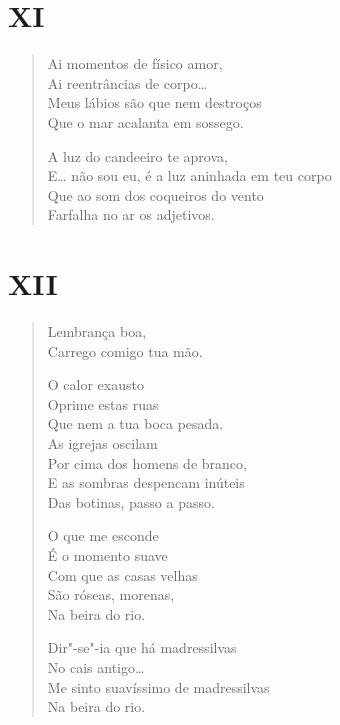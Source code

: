 {\pagebreak
\section*{XI}

\begin{verse}
Ai momentos de físico amor,\\
Ai reentrâncias de corpo\ldots{}\\
Meus lábios são que nem destroços\\
Que o mar acalanta em sossego.

A luz do candeeiro te aprova,\\
E\ldots{} não sou eu, é a luz aninhada em teu corpo\\
Que ao som dos coqueiros do vento\\
Farfalha no ar os adjetivos.
\end{verse}

\pagebreak
\section*{XII}

\begin{verse}
Lembrança boa,\\
Carrego comigo tua mão.

O calor exausto\\
Oprime estas ruas\\
Que nem a tua boca pesada.\\
As igrejas oscilam\\
Por cima dos homens de branco,\\
E as sombras despencam inúteis\\
Das botinas, passo a passo.

O que me esconde\\
É o momento suave\\
Com que as casas velhas\\
São róseas, morenas,\\
Na beira do rio.

Dir"-se"-ia que há madressilvas\\
No cais antigo\ldots{}\\
Me sinto suavíssimo de madressilvas\\
Na beira do rio.
\end{verse}


}

